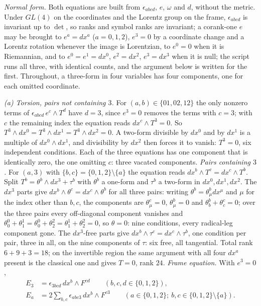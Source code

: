 \emph{Normal form.} Both equations are built from $\epsilon_{abcd}$, $e$, $\omega$ and $d$, without the metric. Under $GL(4)$ on the coordinates and the Lorentz group on the frame, $\epsilon_{abcd}$ is invariant up to $\det$, so ranks and symbol ranks are invariant; a corank-one $e$ may be brought to $e^a = dx^a$ ($a = 0,1,2$), $e^3 = 0$ by a coordinate change and a Lorentz rotation whenever the image is Lorentzian, to $e^0 = 0$ when it is Riemannian, and to $e^0 = e^1 = dx^0$, $e^2 = dx^2$, $e^3 = dx^3$ when it is null; the script runs all three, with identical counts, and the argument below is written for the first. Throughout, a three-form in four variables has four components, one for each omitted coordinate.

\emph{(a) Torsion, pairs not containing $3$.} For $(a,b) \in \{01, 02, 12\}$ the only nonzero terms of $\epsilon_{abcd}\,e^c\wedge T^d$ have $d = 3$, since $e^3 = 0$ removes the terms with $c = 3$; with $c$ the remaining index the equation reads $dx^c\wedge T^3 = 0$. So $T^3\wedge dx^0 = T^3\wedge dx^1 = T^3\wedge dx^2 = 0$. A two-form divisible by $dx^0$ and by $dx^1$ is a multiple of $dx^0\wedge dx^1$, and divisibility by $dx^2$ then forces it to vanish: $T^3 = 0$, six independent conditions. Each of the three equations has one component that is identically zero, the one omitting $c$: three vacated components. \emph{Pairs containing $3$.} For $(a, 3)$ with $\{b, c\} = \{0,1,2\}\setminus\{a\}$ the equation reads $dx^b\wedge T^c = dx^c\wedge T^b$. Split $T^b = \theta^b\wedge dx^3 + \tau^b$ with $\theta^b$ a one-form and $\tau^b$ a two-form in $dx^0, dx^1, dx^2$. The $dx^3$ parts give $dx^b\wedge\theta^c = dx^c\wedge\theta^b$ for all three pairs: writing $\theta^b = \theta^b_\mu dx^\mu$ and $\mu$ for the index other than $b, c$, the components are $\theta^c_\mu = 0$, $\theta^b_\mu = 0$ and $\theta^b_b + \theta^c_c = 0$; over the three pairs every off-diagonal component vanishes and $\theta^0_0 + \theta^1_1 = \theta^0_0 + \theta^2_2 = \theta^1_1 + \theta^2_2 = 0$, so $\theta = 0$: nine conditions, every radical-leg component gone. The $dx^3$-free parts give $dx^b\wedge\tau^c = dx^c\wedge\tau^b$, one condition per pair, three in all, on the nine components of $\tau$: six free, all tangential. Total rank $6 + 9 + 3 = 18$; on the invertible region the same argument with all four $dx^a$ present is the classical one and gives $T = 0$, rank $24$. \emph{Frame equation.} With $e^3 = 0$,
\[
\begin{aligned}
E_3 &= \epsilon_{3bcd}\,dx^b\wedge F^{cd} \qquad (b,c,d \in \{0,1,2\}),\\
E_a &= 2\sum_{b,c}\epsilon_{abc3}\,dx^b\wedge F^{c3} \qquad (a \in \{0,1,2\};\ b, c \in \{0,1,2\}\setminus\{a\}).
\end{aligned}
\]
